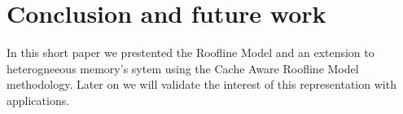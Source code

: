\documentclass[runningheads,a4paper]{llncs}
\begin{document}




\section{Conclusion and future work}

In this short paper we prestented the Roofline Model and an extension to heterogneeous memory's sytem using the Cache Aware
Roofline Model methodology. Later on we will validate the interest of this representation with applications. 




\end{document}
